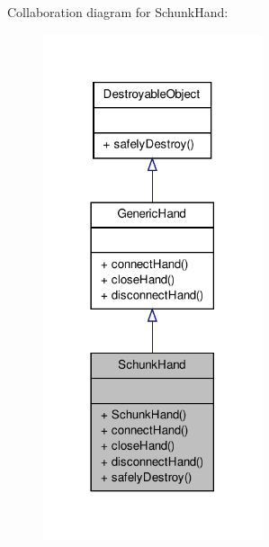\-Collaboration diagram for \-Schunk\-Hand\-:\nopagebreak
\begin{figure}[H]
\begin{center}
\leavevmode
\includegraphics[width=182pt]{classSchunkHand__coll__graph}
\end{center}
\end{figure}

